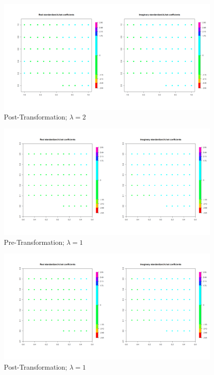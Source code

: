 \documentclass[print]{nuthesis}
\begin{document}
\begin{figure}[tbp]

{\centering \includegraphics[width=\linewidth,]{figure/Stationarity_Apost_l2_k10} 

}

\caption{Post-Transformation; $\lambda=2$}\label{fig:unnamed-chunk-4}
\end{figure}

\begin{figure}[tbp]

{\centering \includegraphics[width=\linewidth,]{figure/Stationarity_Apre_l1_k10} 

}

\caption{Pre-Transformation; $\lambda=1$}\label{fig:unnamed-chunk-5}
\end{figure}

\begin{figure}[tbp]

{\centering \includegraphics[width=\linewidth,]{figure/Stationarity_Apost_l1_k10} 

}

\caption{Post-Transformation; $\lambda=1$}\label{fig:unnamed-chunk-6}
\end{figure}
\end{document}
